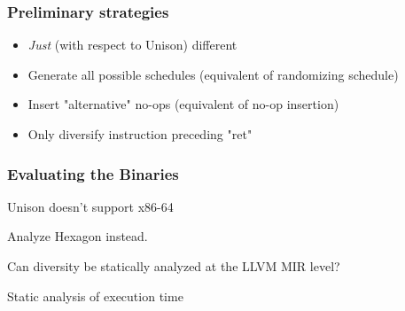 \documentclass{beamer}
\begin{document}


%





\begin{frame}
	\frametitle{Preliminary strategies}

	\begin{itemize}
		\item \textit{Just} (with respect to Unison) different
		\item Generate all possible schedules (equivalent of randomizing schedule)
		\item Insert "alternative" no-ops (equivalent of no-op insertion)
		\item Only diversify instruction preceding "ret"
	\end{itemize}
\end{frame}

\begin{frame}
	\frametitle{Evaluating the Binaries}

	Unison doesn't support x86-64

	\vspace{0.5cm}

	Analyze Hexagon instead.

	\vspace{0.5cm}
	
	Can diversity be statically analyzed at the LLVM MIR level?

	\vspace{0.5cm}

	Static analysis of execution time

\end{frame}
\end{document}
